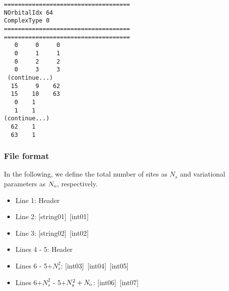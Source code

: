 \begin{minipage}{12.5cm}
\begin{screen}
\begin{verbatim}
====================================
NOrbitalIdx 64   
ComplexType 0
====================================
====================================
   0     0     0 
   0     1     1 
   0     2     2 
   0     3     3 
 (continue...)
  15     9    62 
  15    10    63 
   0    1 
   1    1 
(continue...)
  62    1 
  63    1 
\end{verbatim}
\end{screen}
\end{minipage}

\subsubsection{File format}
In the following, we define the total number of sites as $N_s$ and variational parameters as $N_{\rm o}$, respectively.  

 \begin{itemize}
   \item  Line 1: Header
   \item  Line 2: [string01]~[int01]
   \item  Line 3: [string02]~[int02]
   \item  Lines 4 - 5:  Header
   \item  Lines 6 - 5+$N_s^2$: [int03]~[int04]~[int05]
   \item  Lines 6+$N_s^2$ - 5+$N_s^2+N_{\rm o}$: [int06]~[int07]
  \end{itemize}
